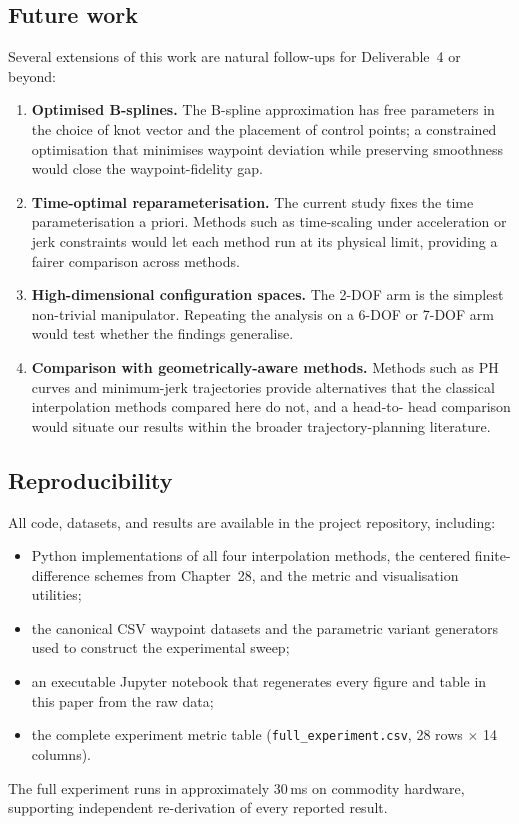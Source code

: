 \subsection{Future work}
\label{sec:future-work}

Several extensions of this work are natural follow-ups for
Deliverable~4 or beyond:

\begin{enumerate}[leftmargin=*]
\item \textbf{Optimised B-splines.} The B-spline approximation has
free parameters in the choice of knot vector and the placement of
control points; a constrained optimisation that minimises waypoint
deviation while preserving smoothness would close the
waypoint-fidelity gap.
\item \textbf{Time-optimal reparameterisation.} The current study
fixes the time parameterisation a priori. Methods such as
time-scaling under acceleration or jerk constraints
\cite{macfarlane2003jerk} would let each method run at its physical
limit, providing a fairer comparison across methods.
\item \textbf{High-dimensional configuration spaces.} The 2-DOF arm
is the simplest non-trivial manipulator. Repeating the analysis on
a 6-DOF or 7-DOF arm would test whether the findings generalise.
\item \textbf{Comparison with geometrically-aware methods.} Methods
such as PH curves and minimum-jerk trajectories
\cite{kyriakopoulos1988minimum} provide alternatives that the
classical interpolation methods compared here do not, and a head-to-
head comparison would situate our results within the broader
trajectory-planning literature.
\end{enumerate}

\subsection{Reproducibility}

All code, datasets, and results are available in the project
repository, including:

\begin{itemize}[leftmargin=*]
\item Python implementations of all four interpolation methods,
the centered finite-difference schemes from Chapter~28, and the
metric and visualisation utilities;
\item the canonical CSV waypoint datasets and the parametric variant
generators used to construct the experimental sweep;
\item an executable Jupyter notebook that regenerates every figure
and table in this paper from the raw data;
\item the complete experiment metric table
(\texttt{full\_experiment.csv}, 28 rows $\times$ 14 columns).
\end{itemize}

The full experiment runs in approximately 30\,ms on commodity
hardware, supporting independent re-derivation of every reported
result.
